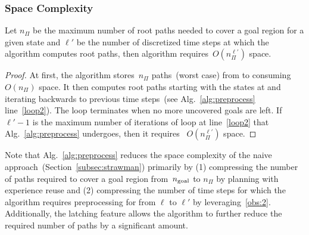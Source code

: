 \documentclass[a4paper]{report}
\begin{document}
\subsubsection{Space Complexity}

\vspace{2mm}
\begin{lemma}
    Let $n_\Pi$ be the maximum number of root paths needed to cover a goal region for a given state \Sstart and $\ell'$ be the number of discretized time steps at which the algorithm computes root paths, then algorithm requires~$O(n_\Pi^{\ell'})$ space.
\end{lemma}
\begin{proof}
 At first, the algorithm stores~$n_\Pi$ paths~(worst case) from \Shome to \Gfull consuming~$O(n_\Pi)$ space. It then computes root paths starting with the states at \Trc and iterating backwards to previous time steps~(see Alg.~\ref{alg:preprocess} line~\ref{loop2}). The loop terminates when no more uncovered goals are left. If~$\ell' - 1$ is the maximum number of iterations of loop at line~\ref{loop2} that Alg.~\ref{alg:preprocess} undergoes, then it requires ~$O(n_\Pi^{\ell'})$ space.
\end{proof}

Note that Alg.~\ref{alg:preprocess} reduces the space complexity of the naive approach~(Section~\ref{subsec:strawman}) primarily by (1) compressing the number of paths required to cover a goal region from~$n_{\rm goal}$ to $n_\Pi$ by planning with experience reuse and (2) compressing the number of time steps for which the algorithm requires preprocessing for from $\ell$ to $\ell'$ by leveraging~\ref{obs:2}.
%
Additionally, the latching feature allows the algorithm to further reduce the required number of paths by a significant amount.
\end{document}
